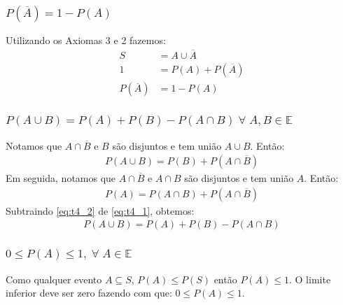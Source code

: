 \documentclass{article}
\newcommand\ov[1]{\overline{#1}}
\begin{document}
\subsubsection{$P(\ov{A}) = 1 - P(A)$}
Utilizando os Axiomas 3 e 2 fazemos:
\begin{align*}
    S &= A \cup \ov{A} \\
    1 &= P(A) + P(\ov{A}) \\
    P(\ov{A}) &= 1 - P(A)
\end{align*}

\subsubsection{$P(A \cup B) = P(A) + P(B) - P(A \cap B) \; \forall \; A,B \in \mathbb{E}$}
Notamos que $A \cap \ov{B}$ e $B$ são disjuntos e tem união $A \cup B$. Então:
\begin{align}
    P(A \cup B) = P(B) + P(A \cap \ov{B}) \label{eq:t4_1}
\end{align}
Em seguida, notamos que $A \cap \ov{B}$ e $A \cap B$ são disjuntos e tem união $A$. Então:
\begin{align}
    P(A) = P(A \cap B) + P(A \cap \ov{B}) \label{eq:t4_2}
\end{align}
Subtraindo \ref{eq:t4_2} de \ref{eq:t4_1}, obtemos:
\begin{align*}
    P(A \cup B) = P(A) + P(B) - P(A \cap B)
\end{align*}

\subsubsection{$0 \leq P(A) \leq 1, \; \forall \; A \in \mathbb{E}$}
Como qualquer evento $A \subseteq S$, $P(A) \leq P(S)$ então $P(A) \leq 1$. O limite inferior deve
ser zero fazendo com que: $0 \leq P(A) \leq 1$.
\end{document}
